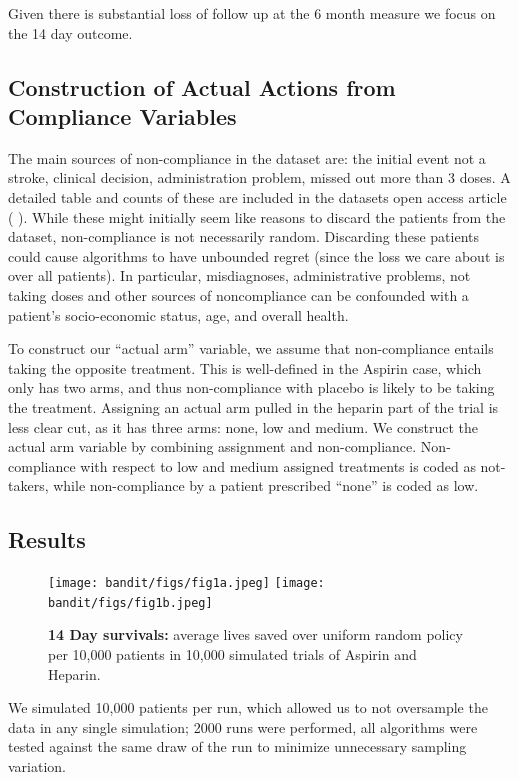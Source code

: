 Given there is substantial loss of follow up at the 6 month measure we focus on the 14 day outcome.


\subsection{Construction of Actual Actions from Compliance Variables}
The main sources of non-compliance in the dataset are: the initial event not a stroke, clinical decision, administration problem, missed out more than 3 doses. A detailed table and counts of these are included in the datasets open access article ( \cite{ist:11}). 
While these might initially seem like reasons to discard the patients from the dataset, non-compliance is not necessarily random. Discarding these patients could cause algorithms to have unbounded regret (since the loss we care about is over all patients). In particular, misdiagnoses, administrative problems, not taking doses and other sources of noncompliance can be confounded with a patient's socio-economic status, age, and overall health. 

To construct our ``actual arm'' variable, we assume that non-compliance entails taking the opposite treatment.
This is well-defined in the Aspirin case, which only has two arms, and thus non-compliance with placebo is likely to be taking the treatment.
Assigning an actual arm pulled in the heparin part of the trial is less clear cut, as it has three arms: none, low and medium. We construct the actual arm variable by combining assignment and non-compliance. Non-compliance with respect to low and medium assigned treatments is coded as  not-takers, while non-compliance by a patient prescribed ``none'' is coded as low.


\subsection{Results}

\begin{figure}
\begin{center}
\texttt{[image: bandit/figs/fig1a.jpeg]}
\texttt{[image: bandit/figs/fig1b.jpeg]}
\caption{\textbf{14 Day survivals:} average lives saved over uniform random policy per 10,000 patients in 10,000 simulated trials of Aspirin and Heparin.}
\label{fig1}
\end{center}
\end{figure} 

We simulated 10,000 patients per run, which allowed us to not oversample the data in any single simulation; 2000 runs were performed, all algorithms were tested against the same draw of the run to minimize unnecessary sampling variation. 

